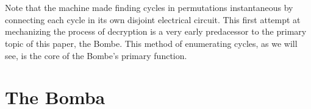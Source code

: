\\\\Note that the machine made finding cycles in permutations instantaneous by connecting each cycle in its own disjoint electrical circuit. This first attempt at mechanizing the process of decryption is a very early predacessor to the primary topic of this paper, the Bombe. This method of enumerating cycles, as we will see, is the core of the Bombe's primary function.
\section{The Bomba}




